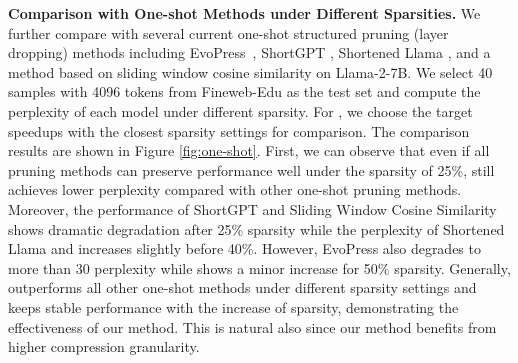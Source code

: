\noindent \textbf{Comparison with One-shot Methods under Different Sparsities.}
We further compare \sysname with several current one-shot structured pruning (layer dropping) methods including EvoPress~\citep{sieberling2024evopress}, ShortGPT \citep{men2024shortgpt}, Shortened Llama \citep{kim2024shortened}, and a method based on sliding window cosine similarity \citep{gromov2024unreasonable} on Llama-2-7B. We select 40 samples with 4096 tokens from Fineweb-Edu as the test set and compute the perplexity of each model under different sparsity. For \sysname, we choose the target speedups with the closest sparsity settings for comparison. The comparison results are shown in Figure \ref{fig:one-shot}. First, we can observe that even if all pruning methods can preserve performance well under the sparsity of 25\%, \sysname still achieves lower perplexity compared with other one-shot pruning methods. Moreover, the performance of ShortGPT and Sliding Window Cosine Similarity shows dramatic degradation after 25\% sparsity while the perplexity of Shortened Llama and \sysname increases slightly before 40\%. However, EvoPress also degrades to more than 30 perplexity while \sysname shows a minor increase for 50\% sparsity. Generally, \sysname outperforms all other one-shot methods under different sparsity settings and keeps stable performance with the increase of sparsity, demonstrating the effectiveness of our method. This is natural also since our method benefits from higher compression granularity. 



